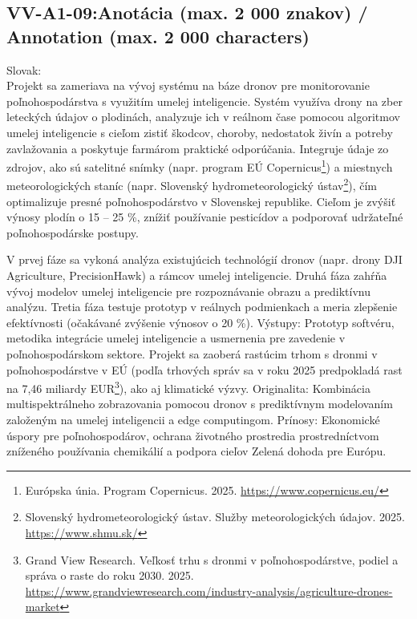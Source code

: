 \subsection*{VV-A1-09:Anotácia (max. 2 000 znakov) / Annotation (max. 2 000 characters) }
Slovak:\\Projekt sa zameriava na vývoj systému na báze dronov pre monitorovanie poľnohospodárstva s využitím umelej inteligencie. Systém využíva drony na zber leteckých údajov o plodinách, analyzuje ich v reálnom čase pomocou algoritmov umelej inteligencie s cieľom zistiť škodcov, choroby, nedostatok živín a potreby zavlažovania a poskytuje farmárom praktické odporúčania. Integruje údaje zo zdrojov, ako sú satelitné snímky (napr. program EÚ Copernicus\footnote{Európska únia. Program Copernicus. 2025. \url{https://www.copernicus.eu/}}) a miestnych meteorologických staníc (napr. Slovenský hydrometeorologický ústav\footnote{Slovenský hydrometeorologický ústav. Služby meteorologických údajov. 2025. \url{https://www.shmu.sk/}}), čím optimalizuje presné poľnohospodárstvo v Slovenskej republike. Cieľom je zvýšiť výnosy plodín o 15 – 25 \%, znížiť používanie pesticídov a podporovať udržateľné poľnohospodárske postupy.

V prvej fáze sa vykoná analýza existujúcich technológií dronov (napr. drony DJI Agriculture, PrecisionHawk) a rámcov umelej inteligencie. Druhá fáza zahŕňa vývoj modelov umelej inteligencie pre rozpoznávanie obrazu a prediktívnu analýzu. Tretia fáza testuje prototyp v reálnych podmienkach a meria zlepšenie efektívnosti (očakávané zvýšenie výnosov o 20 \%). Výstupy: Prototyp softvéru, metodika integrácie umelej inteligencie a usmernenia pre zavedenie v poľnohospodárskom sektore.
Projekt sa zaoberá rastúcim trhom s dronmi v poľnohospodárstve v EÚ (podľa trhových správ sa v roku 2025 predpokladá rast na 7,46 miliardy EUR\footnote{Grand View Research. Veľkosť trhu s dronmi v poľnohospodárstve, podiel a správa o raste do roku 2030. 2025. \url{https://www.grandviewresearch.com/industry-analysis/agriculture-drones-market}}), ako aj klimatické výzvy. Originalita: Kombinácia multispektrálneho zobrazovania pomocou dronov s prediktívnym modelovaním založeným na umelej inteligencii a edge computingom. Prínosy: Ekonomické úspory pre poľnohospodárov, ochrana životného prostredia prostredníctvom zníženého používania chemikálií a podpora cieľov Zelená dohoda pre Európu.
\\

